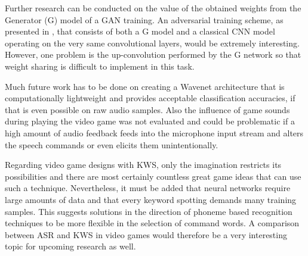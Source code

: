 Further research can be conducted on the value of the obtained weights from the Generator (G) model of a GAN training. 
An adversarial training scheme, as presented in \cite{Oezdenizci2020}, that consists of both a G model and a classical CNN model operating on the very same convolutional layers, would be extremely interesting. 
However, one problem is the up-convolution performed by the G network so that weight sharing is difficult to implement in this task.

Much future work has to be done on creating a Wavenet architecture that is computationally lightweight and provides acceptable classification accuracies, if that is even possible on raw audio samples.
Also the influence of game sounds during playing the video game was not evaluated and could be problematic if a high amount of audio feedback feeds into the microphone input stream and alters the speech commands or even elicits them unintentionally.

Regarding video game designs with KWS, only the imagination restricts its possibilities and there are most certainly countless great game ideas that can use such a technique.
Nevertheless, it must be added that neural networks require large amounts of data and that every keyword spotting demands many training samples.
This suggests solutions in the direction of phoneme based recognition techniques to be more flexible in the selection of command words.
A comparison between ASR and KWS in video games would therefore be a very interesting topic for upcoming research as well.